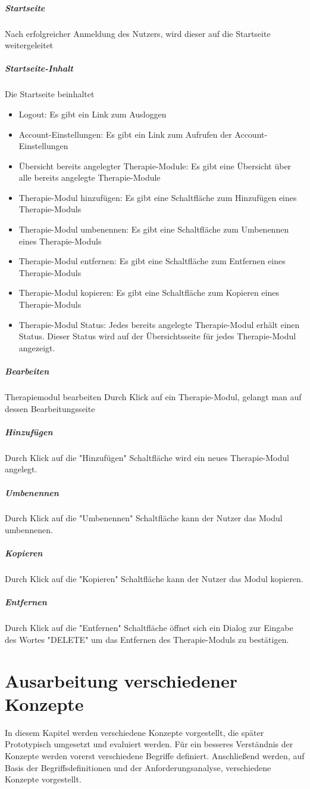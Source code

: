 \subparagraph{Startseite}Nach erfolgreicher Anmeldung des Nutzers, wird dieser auf die Startseite weitergeleitet
\subparagraph{Startseite-Inhalt}Die Startseite beinhaltet
\begin{itemize}
\item Logout: Es gibt ein Link zum Ausloggen
\item Account-Einstellungen: Es gibt ein Link zum Aufrufen der Account-Einstellungen
\item Übersicht bereits angelegter Therapie-Module: Es gibt eine Übersicht über alle bereits angelegte Therapie-Module
\item Therapie-Modul hinzufügen: Es gibt eine Schaltfläche zum Hinzufügen eines Therapie-Moduls
\item Therapie-Modul umbenennen: Es gibt eine Schaltfläche zum Umbenennen eines Therapie-Moduls
\item Therapie-Modul entfernen: Es gibt eine Schaltfläche zum Entfernen eines Therapie-Moduls
\item  Therapie-Modul kopieren: Es gibt eine Schaltfläche zum Kopieren eines Therapie-Moduls
\item Therapie-Modul Status: Jedes bereits angelegte Therapie-Modul erhält einen Status. Dieser Status wird auf der Übersichtsseite für jedes Therapie-Modul angezeigt.
\end{itemize}
	
\subparagraph{Bearbeiten} Therapiemodul bearbeiten	Durch Klick auf ein Therapie-Modul, gelangt man auf dessen Bearbeitungsseite
		
\subparagraph{Hinzufügen}Durch Klick auf die "Hinzufügen" Schaltfläche wird ein neues Therapie-Modul angelegt.

\subparagraph{Umbenennen} Durch Klick auf die "Umbenennen" Schaltfläche kann der Nutzer das Modul umbennenen.

\subparagraph{Kopieren} Durch Klick auf die "Kopieren" Schaltfläche kann der Nutzer das Modul kopieren.

\subparagraph{Entfernen} Durch Klick auf die "Entfernen" Schaltfläche öffnet sich ein Dialog zur Eingabe des Wortes "DELETE" um das Entfernen des Therapie-Moduls zu bestätigen.


\section{Ausarbeitung verschiedener Konzepte}
In diesem Kapitel werden verschiedene Konzepte vorgestellt, die später Prototypisch umgesetzt und evaluiert werden. Für ein besseres Verständnis der Konzepte werden vorerst verschiedene Begriffe definiert. Anschließend werden, auf Basis der Begriffsdefinitionen und der Anforderungsanalyse, verschiedene Konzepte vorgestellt. 

